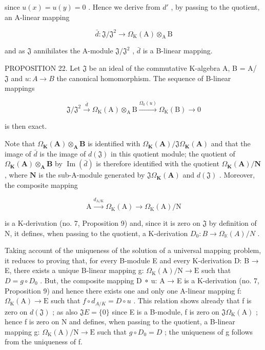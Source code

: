 since \(u(x) = u(y) = 0\) . Hence we derive from \(d'\) , by passing to the quotient, an A-linear mapping

\[
\bar {d} \colon \mathfrak {J} / \mathfrak {J} ^ {2} \rightarrow \Omega_ {\mathrm{K}} (\mathrm{A}) \otimes_ {\mathrm{A}} \mathrm{B}
\]

and as \(\mathfrak{J}\) annihilates the A-module \(\mathfrak{J} / \mathfrak{J}^2\) , \(\bar{d}\) is a B-linear mapping.

PROPOSITION 22. Let \(\mathfrak{J}\) be an ideal of the commutative K-algebra A, B = A/ \(\mathfrak{J}\) and \(u:A\to B\) the canonical homomorphism. The sequence of B-linear mappings

\[
\mathfrak {J} / \mathfrak {J} ^ {2} \xrightarrow {\overline {{d}}} \Omega_ {\mathrm{K}} (\mathrm{A}) \otimes_ {\mathrm{A}} \mathrm{B} \xrightarrow {\Omega_ {0} (u)} \Omega_ {\mathrm{K}} (\mathrm{B}) \to 0\tag{46}
\]

is then exact.

Note that \(\Omega_{\mathbf{K}}(\mathbf{A}) \otimes_{\mathbf{A}} \mathbf{B}\) is identified with \(\Omega_{\mathbf{K}}(\mathbf{A}) / \mathfrak{J} \Omega_{\mathbf{K}}(\mathbf{A})\) and that the image of \(\bar{d}\) is the image of \(d(\mathfrak{J})\) in this quotient module; the quotient of \(\Omega_{\mathbf{K}}(\mathbf{A}) \otimes_{\mathbf{A}} \mathbf{B}\) by \(\operatorname{Im}(\bar{d})\) is therefore identified with the quotient \(\Omega_{\mathbf{K}}(\mathbf{A}) / \mathbf{N}\) , where \(\mathbf{N}\) is the sub-A-module generated by \(\mathfrak{J} \Omega_{\mathbf{K}}(\mathbf{A})\) and \(d(\mathfrak{J})\) . Moreover, the composite mapping

\[
\mathrm{A} \xrightarrow {d _ {\mathrm{A} / \mathrm{K}}} \Omega_ {\mathrm{K}} (\mathrm{A}) \longrightarrow \Omega_ {\mathrm{K}} (\mathrm{A}) / \mathrm{N}
\]

is a K-derivation (no. 7, Proposition 9) and, since it is zero on \(\mathfrak{J}\) by definition of N, it defines, when passing to the quotient, a K-derivation \(D_0:B\to \Omega_{\mathbb{K}}(A) / N\) .

Taking account of the uniqueness of the solution of a universal mapping problem, it reduces to proving that, for every B-module E and every K-derivation D: B → E, there exists a unique B-linear mapping g: \(\Omega_{\mathrm{K}}(\mathrm{A})/\mathrm{N} \rightarrow \mathrm{E}\) such that \(D = g \circ D_{0}\) . But, the composite mapping D ∘ u: A → E is a K-derivation (no. 7, Proposition 9) and hence there exists one and only one A-linear mapping f: \(\Omega_{\mathrm{K}}(\mathrm{A}) \rightarrow \mathrm{E}\) such that \(f \circ d_{A/K} = D \circ u\) . This relation shows already that f is zero on \(d(\mathfrak{J})\) ; as also \(\mathfrak{J} E = \{0\}\) since E is a B-module, f is zero on \(\mathfrak{J} \Omega_{\mathrm{K}}(\mathrm{A})\) ; hence f is zero on N and defines, when passing to the quotient, a B-linear mapping g: \(\Omega_{\mathrm{K}}(\mathrm{A})/\mathrm{N} \rightarrow \mathrm{E}\) such that \(g \circ D_{0} = D\) ; the uniqueness of g follows from the uniqueness of f.


